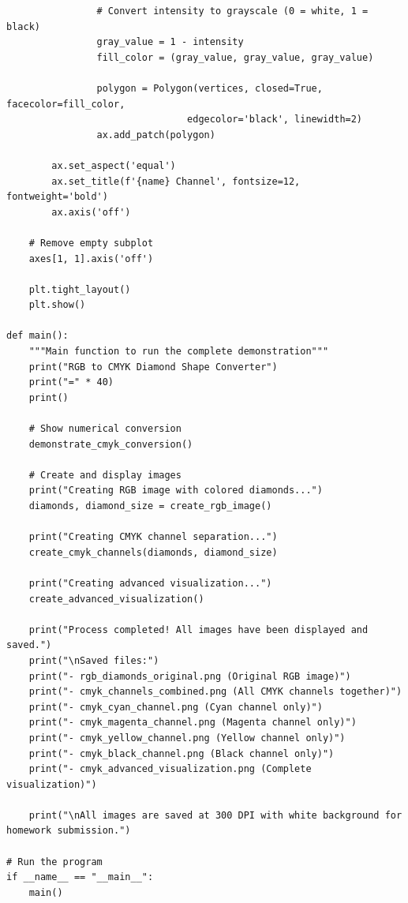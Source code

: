 \documentclass{article}
\begin{document}
\begin{lstlisting}
                # Convert intensity to grayscale (0 = white, 1 = black)
                gray_value = 1 - intensity
                fill_color = (gray_value, gray_value, gray_value)
                
                polygon = Polygon(vertices, closed=True, facecolor=fill_color, 
                                edgecolor='black', linewidth=2)
                ax.add_patch(polygon)
        
        ax.set_aspect('equal')
        ax.set_title(f'{name} Channel', fontsize=12, fontweight='bold')
        ax.axis('off')
    
    # Remove empty subplot
    axes[1, 1].axis('off')
    
    plt.tight_layout()
    plt.show()

def main():
    """Main function to run the complete demonstration"""
    print("RGB to CMYK Diamond Shape Converter")
    print("=" * 40)
    print()
    
    # Show numerical conversion
    demonstrate_cmyk_conversion()
    
    # Create and display images
    print("Creating RGB image with colored diamonds...")
    diamonds, diamond_size = create_rgb_image()
    
    print("Creating CMYK channel separation...")
    create_cmyk_channels(diamonds, diamond_size)
    
    print("Creating advanced visualization...")
    create_advanced_visualization()
    
    print("Process completed! All images have been displayed and saved.")
    print("\nSaved files:")
    print("- rgb_diamonds_original.png (Original RGB image)")
    print("- cmyk_channels_combined.png (All CMYK channels together)")
    print("- cmyk_cyan_channel.png (Cyan channel only)")
    print("- cmyk_magenta_channel.png (Magenta channel only)")
    print("- cmyk_yellow_channel.png (Yellow channel only)")
    print("- cmyk_black_channel.png (Black channel only)")
    print("- cmyk_advanced_visualization.png (Complete visualization)")
    
    print("\nAll images are saved at 300 DPI with white background for homework submission.")

# Run the program
if __name__ == "__main__":
    main()
\end{lstlisting}
\end{document}
